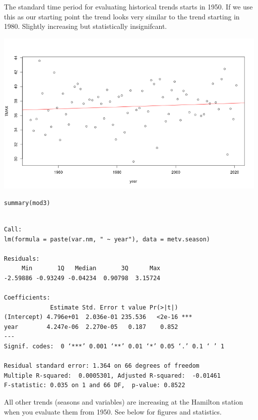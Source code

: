 \documentclass[11pt]{article}
\begin{document}
The standard time period for evaluating historical trends starts in 1950. If we
use this as our starting point the trend looks very similar to the trend
starting in 1980. Slightly increasing but statistically insignifcant.

\begin{center}
\includegraphics[width=.9\linewidth]{summer_tmin_1950.png}
\end{center}

\begin{verbatim}
summary(mod3)
\end{verbatim}

\begin{verbatim}

Call:
lm(formula = paste(var.nm, " ~ year"), data = metv.season)

Residuals:
     Min       1Q   Median       3Q      Max 
-2.59886 -0.93249 -0.04234  0.90798  3.15724 

Coefficients:
             Estimate Std. Error t value Pr(>|t|)    
(Intercept) 4.796e+01  2.036e-01 235.536   <2e-16 ***
year        4.247e-06  2.270e-05   0.187    0.852    
---
Signif. codes:  0 ‘***’ 0.001 ‘**’ 0.01 ‘*’ 0.05 ‘.’ 0.1 ‘ ’ 1

Residual standard error: 1.364 on 66 degrees of freedom
Multiple R-squared:  0.0005301,	Adjusted R-squared:  -0.01461 
F-statistic: 0.035 on 1 and 66 DF,  p-value: 0.8522
\end{verbatim}

All other trends (seasons and variables) are increasing at the Hamilton station
when you evaluate them from 1950. See below for figures and statistics.
\end{document}
